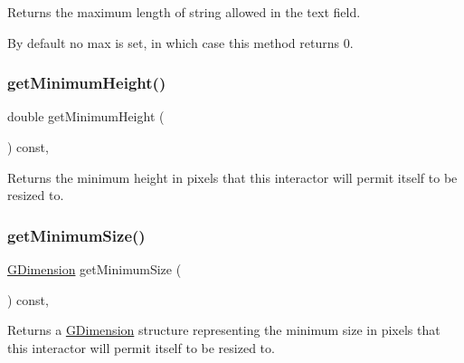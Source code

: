 Returns the maximum length of string allowed in the text field. 

By default no max is set, in which case this method returns 0. \mbox{\label{classGInteractor_aed4b0075fcc434499c3cb3e46896bda3}} 
\subsubsection{\texorpdfstring{get\+Minimum\+Height()}{getMinimumHeight()}}
{\footnotesize\ttfamily double get\+Minimum\+Height (\begin{DoxyParamCaption}{ }\end{DoxyParamCaption}) const\hspace{0.3cm}{\ttfamily [virtual]}, {\ttfamily [inherited]}}



Returns the minimum height in pixels that this interactor will permit itself to be resized to. 

\mbox{\label{classGInteractor_a66b5af0b32493b4d597ca0a3df2049ea}} 
\subsubsection{\texorpdfstring{get\+Minimum\+Size()}{getMinimumSize()}}
{\footnotesize\ttfamily \mbox{\hyperlink{structGDimension}{G\+Dimension}} get\+Minimum\+Size (\begin{DoxyParamCaption}{ }\end{DoxyParamCaption}) const\hspace{0.3cm}{\ttfamily [virtual]}, {\ttfamily [inherited]}}



Returns a \mbox{\hyperlink{structGDimension}{G\+Dimension}} structure representing the minimum size in pixels that this interactor will permit itself to be resized to. 

\mbox{\label{classGInteractor_a59e668114fe3d49d2a0f28deb258f7c8}} 
